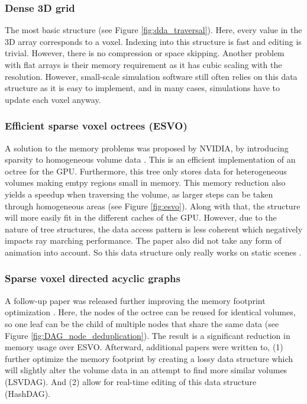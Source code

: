 \subsubsection{Dense 3D grid} \label{related_work:voxel_data_structures:dense_grid}
The most basic structure (see Figure \ref{fig:dda_traversal}). Here, every value in the 3D array corresponds to a voxel. Indexing into this structure is fast and editing is trivial. However, there is no compression or space skipping. Another problem with flat arrays is their memory requirement as it has cubic scaling with the resolution. However, small-scale simulation software still often relies on this data structure as it is easy to implement, and in many cases, simulations have to update each voxel anyway.



\subsubsection{Efficient sparse voxel octrees (ESVO)} \label{related_work:voxel_data_structures:esvo}
A solution to the memory problems was proposed by NVIDIA, by introducing sparsity to homogeneous volume data \cite{laine2010efficient}. This is an efficient implementation of an octree for the GPU. Furthermore, this tree only stores data for heterogeneous volumes making emtpy regions small in memory. This memory reduction also yields a speedup when traversing the volume, as larger steps can be taken through homogeneous areas (see Figure \ref{fig:esvo}). Along with that, the structure will more easily fit in the different caches of the GPU. However, due to the nature of tree structures, the data access pattern is less coherent which negatively impacts ray marching performance. The paper also did not take any form of animation into account. So this data structure only really works on static scenes \cite{JohnLinPerfectEngine}.


\subsubsection{Sparse voxel directed acyclic graphs} \label{related_work:voxel_data_structures:svdag}
A follow-up paper was released further improving the memory footprint optimization \cite{kampe2013high}. Here, the nodes of the octree can be reused for identical volumes, so one leaf can be the child of multiple nodes that share the same data (see Figure \ref{fig:DAG_node_deduplication}). The result is a significant reduction in memory usage over ESVO. Afterward, additional papers were written to, (1) further optimize the memory footprint by creating a lossy data structure which will slightly alter the volume data in an attempt to find more similar volumes \cite{van2020lossy} (LSVDAG). And (2) allow for real-time editing of this data structure \cite{careil2020interactively} (HashDAG).

